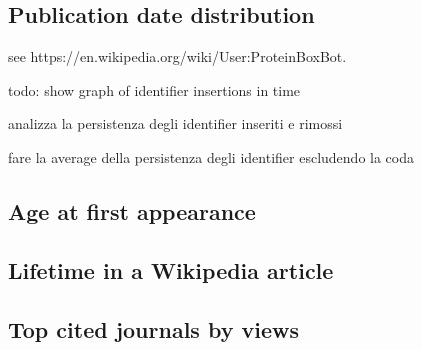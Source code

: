 \subsection{Publication date distribution}
see https://en.wikipedia.org/wiki/User:ProteinBoxBot.

todo: show graph of identifier insertions in time

analizza la persistenza degli identifier inseriti e rimossi

fare la average della persistenza degli identifier escludendo la coda

\subsection{Age at first appearance}

\subsection{Lifetime in a Wikipedia article}

\subsection{Top cited journals by views}
